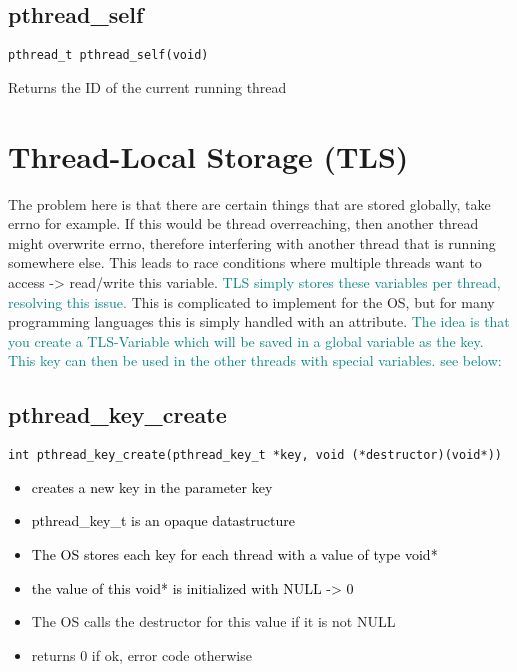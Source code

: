 \documentclass[main.tex,fontsize=8pt,paper=a4,paper=portrait,DIV=calc,]{scrartcl}
\begin{document}
\subsection{pthread\_self}
\begin{lstlisting}
pthread_t pthread_self(void)
\end{lstlisting}
Returns the ID of the current running thread

\section{Thread-Local Storage (TLS)}
The problem here is that there are certain things that are stored globally, take errno for example.\newline
If this would be thread overreaching, then another thread might overwrite errno, therefore interfering with another thread that is running somewhere else.\newline
This leads to race conditions where multiple threads want to access -> read/write this variable.\newline
\textcolor{teal}{TLS simply stores these variables per thread, resolving this issue.}\newline
This is complicated to implement for the OS, but for many programming languages this is simply handled with an attribute.\newline
\textcolor{teal}{The idea is that you create a TLS-Variable which will be saved in a global variable as the key.\newline
This key can then be used in the other threads with special variables. see below:}

\subsection{pthread\_key\_create}
\begin{lstlisting}
int pthread_key_create(pthread_key_t *key, void (*destructor)(void*))
\end{lstlisting}
\begin{itemize}
\item \textcolor{black}{creates a new key in the parameter key}
\item \textcolor{black}{pthread\_key\_t is an opaque datastructure}
\item \textcolor{black}{The OS stores each key for each thread with a value of type void*}
\item \textcolor{black}{the value of this void* is initialized with NULL -> 0}
\item The OS calls the destructor for this value if it is not NULL
\item returns 0 if ok, error code otherwise
\end{itemize} 
\end{document}
